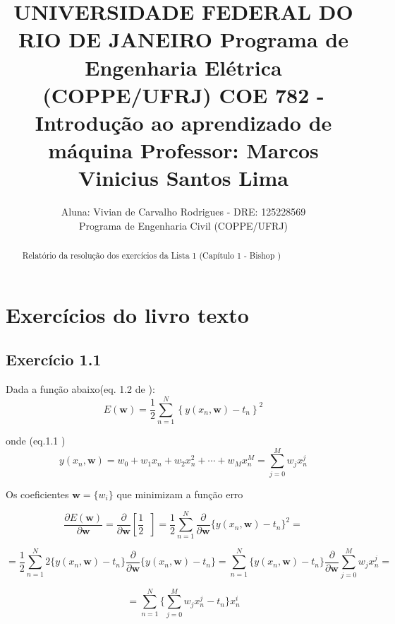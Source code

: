 \documentclass{article}
\title{UNIVERSIDADE FEDERAL DO RIO DE JANEIRO  \hspace{5cm}
	   Programa de Engenharia Elétrica (COPPE/UFRJ) \hspace{5cm}
	   COE 782 - Introdução ao aprendizado de máquina  \hspace{5cm} 
	  Professor: Marcos Vinicius Santos Lima}
\author{Aluna: Vivian de Carvalho Rodrigues - DRE: 125228569  \\
	    Programa de Engenharia Civil (COPPE/UFRJ)}
\begin{document}
\maketitle

\begin{abstract}
Relatório da resolução dos exercícios da Lista 1 (Cap\'itulo 1 - Bishop \cite{Bishop2006})
\end{abstract}

\section{Exerc\'icios do livro texto}

\subsection{ Exerc\'icio 1.1}

  Dada a função abaixo(eq. 1.2 de \cite{Bishop2006}):
    \begin{equation}
       	E(\mathbf{w})=\frac{1}{2}\sum_{n=1}^{N}\left\{ y\left(x_{n}, \mathbf{w}\right)-t_{n}\right\} ^{2}                          \label{somaq}
    \end{equation}

  onde (eq.1.1 \cite{Bishop2006})
    \begin{equation}
	    y(x_{n},\mathbf{w})=w_{0}+w_{1}x_{n}+w_{2}x_{n}^{2}+\cdots+w_{M}x_{n}^{M}=\sum_{j=0}^{M}w_{j}x_{n}^{j}                               \label{polinomio}
    \end{equation}

  Os coeficientes $\mathbf{w}=\{ w_{i}\} $ que minimizam a função erro
  
  \[
	 \frac{\partial E(\mathbf{w})}{\partial \mathbf{w}}=\frac{\partial}{\partial \mathbf{w}}\left[\frac{1}{2}\mathop{\sum_{n=1}^{N}\left\{ y\left(x_{n}, \mathbf{w}\right)-t_{n} \right\}^{2} }\right] = \frac{1}{2}\sum_{n=1}^{N} \frac{\partial}{\partial \mathbf{w}}  \{ y\left(x_{n}, \mathbf{w}\right)-t_{n} \} ^{2} =
  \]
  
  \[
    = \frac{1}{2} \sum_{n=1}^{N} 2 \{ y\left(x_{n}, \mathbf{w}\right)-t_{n} \}\frac{\partial}{\partial \mathbf{w}}\{ y\left(x_{n}, \mathbf{w}\right)-t_{n} \} = \sum_{n=1}^{N} \{ y\left(x_{n}, \mathbf{w}\right)-t_{n} \} \frac{\partial}{\partial \mathbf{w}}\sum_{j=0}^{M}w_{j}x_{n}^{j} =
  \]
  
  \[
    = \sum_{n=1}^{N} \{ \sum_{j=0}^{M}w_{j}x_{n}^{j}-t_{n} \} x_{n}^{i}
  \]
  
\end{document}
